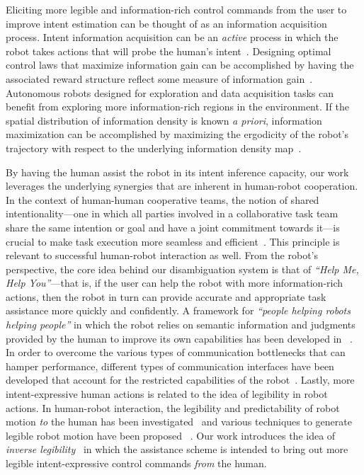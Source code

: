 Eliciting more legible and information-rich control commands from the user to improve intent estimation can be thought of as an information acquisition process. Intent information acquisition can be an \textit{active} process in which the robot takes actions that will probe the human's intent~\citep{sadigh2016information, sadigh2016planning}. Designing optimal control laws that maximize information gain can be accomplished by having the associated reward structure reflect some measure of information gain~\citep{atanasov2014information}. 
Autonomous robots designed for exploration and data acquisition tasks can benefit from exploring more information-rich regions in the environment. If the spatial distribution of information density is known \textit{a priori}, information maximization can be accomplished by maximizing the ergodicity of the robot's trajectory with respect to the underlying information density map~\citep{miller2016ergodic, miller2013trajectory}. 

By having the human assist the robot in its intent inference capacity, our work leverages the underlying synergies that are inherent in human-robot cooperation. In the context of human-human cooperative teams, the notion of shared intentionality---one in which all parties involved in a collaborative task team share the same intention or goal and have a joint commitment towards it---is crucial to make task execution more seamless and efficient~\citep{tomasello2007shared, tomasello2010gap}. This principle is relevant to successful human-robot interaction as well. From the robot's perspective, the core idea behind our disambiguation system is that of \textit{``Help Me, Help You''}---that is, if the user can help the robot with more information-rich actions, then the robot in turn can provide accurate and appropriate task assistance more quickly and confidently. A framework for \textit{``people helping robots helping people''} in which the robot relies on semantic information and judgments provided by the human to improve its own capabilities has been developed in ~\citep{sorokin2010people}. In order to overcome the various types of communication bottlenecks that can hamper performance, different types of communication interfaces have been developed that account for the restricted capabilities of the robot~\citep{goodfellow2010help}. Lastly, more intent-expressive human actions is related to the idea of legibility in robot actions. In human-robot interaction, the legibility and predictability of robot motion \textit{to} the human has been investigated~\citep{dragan2013legibility} and various techniques to generate legible robot motion have been proposed ~\citep{holladay2014legible}. Our work introduces the idea of \textit{inverse legibility}~\citep{gopinath2017mode} in which the assistance scheme is intended to bring out more legible intent-expressive control commands \textit{from} the human. 


